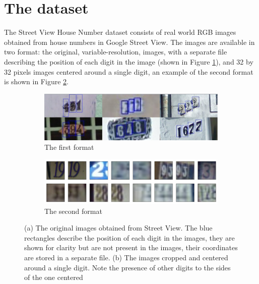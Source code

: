 \documentclass[12pt]{article}
\begin{document}
\section*{The dataset}
The Street View House Number dataset consists of real world RGB images obtained from house numbers in Google Street View. The images are available in two format: the original, variable-resolution, images, with a separate file describing the position of each digit in the image (shown in Figure \ref{fig:svhn1}), and
32 by 32 pixels images centered around a single digit, an example of the second format is shown in Figure \ref{fig:svhn2}.

\begin{figure}[h]\centering
	\begin{subfigure}{\textwidth}
		\includegraphics[width=\textwidth]{svhn-ocr}
		\caption{The first format}
		\label{fig:svhn1}
	\end{subfigure}

	\begin{subfigure}{\textwidth}
		\includegraphics[width=\textwidth]{svhn-centered}
		\caption{The second format}
		\label{fig:svhn2}
	\end{subfigure}
	\label{fig:svhn}
	\caption{(a) The original images obtained from Street View. The blue rectangles describe the position of each digit in the images, they are shown for clarity but are not present in the images, their coordinates are stored in a separate file. (b) The images cropped and centered around a single digit. Note the presence of other digits to the sides of the one centered}
\end{figure}
\end{document}
